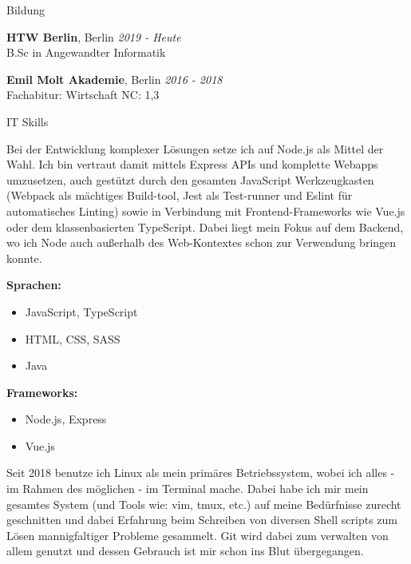 \documentclass{cv}
\begin{document}
\begin{rSection}{Bildung}

{\bf HTW Berlin}, Berlin \hfill {\em 2019 - Heute}\\
B.Sc in Angewandter Informatik

\smallskip

{\bf Emil Molt Akademie}, Berlin \hfill {\em 2016 - 2018}\\
Fachabitur: Wirtschaft \hfill NC: 1,3
\end{rSection}

\begin{rSection}{IT Skills}
  \newcommand\skillWidth{0.48}
  \begin{minipage}[t]{\skillWidth\linewidth}

Bei der Entwicklung komplexer Lösungen setze ich auf Node.js als Mittel der
Wahl. Ich bin vertraut damit mittels Express APIs und komplette Webapps
umzusetzen, auch gestützt durch den gesamten JavaScript Werkzeugkasten (Webpack
als mächtiges Build-tool, Jest als Test-runner und Eslint für automatisches
Linting) sowie in Verbindung mit Frontend-Frameworks wie Vue.js oder dem
klassenbasierten TypeScript. Dabei liegt mein Fokus auf dem Backend, wo ich Node
auch außerhalb des Web-Kontextes schon zur Verwendung bringen konnte.

    \medskip

    \textbf{Sprachen:}
    \begin{itemize}
      \item JavaScript, TypeScript
      \item HTML, CSS, SASS
      \item Java
    \end{itemize}

    \textbf{Frameworks:}
    \begin{itemize}
      \item Node.js, Express
      \item Vue.js
    \end{itemize}
  \end{minipage}
  \hfill
  \begin{minipage}[t]{\skillWidth\linewidth}

Seit 2018 benutze ich Linux als mein primäres Betriebssystem, wobei ich
alles - im Rahmen des möglichen - im Terminal mache. Dabei habe ich mir mein
gesamtes System (und Tools wie: vim, tmux, etc.) auf meine Bedürfnisse zurecht
geschnitten und dabei Erfahrung beim Schreiben von diversen Shell scripts zum
Lösen mannigfaltiger Probleme gesammelt. Git wird dabei zum verwalten von allem
genutzt und dessen Gebrauch ist mir schon ins Blut übergegangen.


\end{minipage}
\end{rSection}
\end{document}
